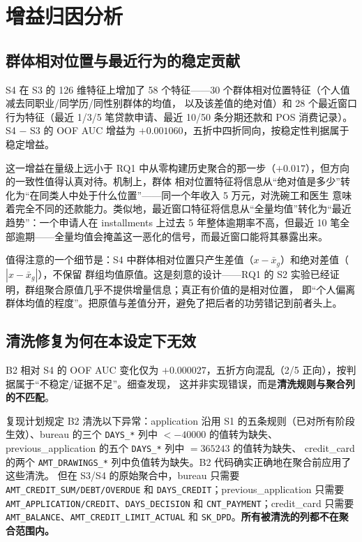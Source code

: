 \documentclass[11pt,UTF8,fontset=windows]{ctexrep}
\begin{document}
\section{增益归因分析}

\subsection{群体相对位置与最近行为的稳定贡献}

S4 在 S3 的 126 维特征上增加了 58 个特征——30 个群体相对位置特征（个人值减去同职业/同学历/同性别群体的均值，
以及该差值的绝对值）和 28 个最近窗口行为特征（最近 1/3/5 笔贷款申请、最近 10/50 条分期还款和 POS 消费记录）。
S4 $-$ S3 的 OOF AUC 增益为 $+0.001060$，五折中四折同向，按稳定性判据属于稳定增益。

这一增益在量级上远小于 RQ1 中从零构建历史聚合的那一步（$+0.017$），但方向的一致性值得认真对待。机制上，群体
相对位置特征将信息从“绝对值是多少”转化为“在同类人中处于什么位置”——同一个年收入 5 万元，对洗碗工和医生
意味着完全不同的还款能力。类似地，最近窗口特征将信息从“全量均值”转化为“最近趋势”：一个申请人在 installments
上过去 5 年整体逾期率不高，但最近 10 笔全部逾期——全量均值会掩盖这一恶化的信号，而最近窗口能将其暴露出来。

值得注意的一个细节是：S4 中群体相对位置只产生差值（$x - \bar{x}_g$）和绝对差值（$|x - \bar{x}_g|$），不保留
群组均值原值。这是刻意的设计——RQ1 的 S2 实验已经证明，群组聚合原值几乎不提供增量信息；真正有价值的是相对位置，
即“个人偏离群体均值的程度”。把原值与差值分开，避免了把后者的功劳错记到前者头上。

\subsection{清洗修复为何在本设定下无效}

B2 相对 S4 的 OOF AUC 变化仅为 $+0.000027$，五折方向混乱（2/5 正向），按判据属于“不稳定/证据不足”。细查发现，
这并非实现错误，而是\textbf{清洗规则与聚合列的不匹配}。

复现计划规定 B2 清洗以下异常：application 沿用 S1 的五条规则（已对所有阶段生效）、bureau 的三个 \texttt{DAYS\_*}
列中 $< -40000$ 的值转为缺失、previous\_application 的五个 \texttt{DAYS\_*} 列中 $=365243$ 的值转为缺失、
credit\_card 的两个 \texttt{AMT\_DRAWINGS\_*} 列中负值转为缺失。B2 代码确实正确地在聚合前应用了这些清洗。
但在 S3/S4 的原始聚合中，bureau 只需要 \texttt{AMT\_CREDIT\_SUM/DEBT/OVERDUE} 和 \texttt{DAYS\_CREDIT}；previous\_application
只需要 \texttt{AMT\_APPLICATION/CREDIT}、\texttt{DAYS\_DECISION} 和 \texttt{CNT\_PAYMENT}；credit\_card 只需要
\texttt{AMT\_BALANCE}、\texttt{AMT\_CREDIT\_LIMIT\_ACTUAL} 和 \texttt{SK\_DPD}。\textbf{所有被清洗的列都不在聚合范围内。}
\end{document}
